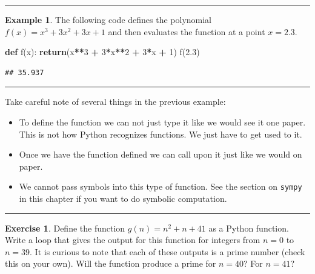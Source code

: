 \documentclass[
]{book}
\newenvironment{Shaded}{\begin{snugshade}}{\end{snugshade}}
\newcommand{\ControlFlowTok}[1]{\textcolor[rgb]{0.13,0.29,0.53}{\textbf{#1}}}
\newcommand{\DecValTok}[1]{\textcolor[rgb]{0.00,0.00,0.81}{#1}}
\newcommand{\FloatTok}[1]{\textcolor[rgb]{0.00,0.00,0.81}{#1}}
\newcommand{\KeywordTok}[1]{\textcolor[rgb]{0.13,0.29,0.53}{\textbf{#1}}}
\newcommand{\NormalTok}[1]{#1}
\newcommand{\OperatorTok}[1]{\textcolor[rgb]{0.81,0.36,0.00}{\textbf{#1}}}
\providecommand{\tightlist}{%
  \setlength{\itemsep}{0pt}\setlength{\parskip}{0pt}}
\theoremstyle{definition}
\theoremstyle{definition}
\newtheorem{example}{Example}[chapter]
\theoremstyle{definition}
\newtheorem{exercise}{Exercise}[chapter]
\theoremstyle{remark}
\begin{document}
\begin{center}\rule{0.5\linewidth}{0.5pt}\end{center}

\begin{example}
\protect\hypertarget{exm:unnamed-chunk-680}{}{\label{exm:unnamed-chunk-680} }The following code defines the polynomial \(f(x) = x^3 + 3x^2 + 3x + 1\) and then evaluates the function at a point \(x=2.3\).
\end{example}

\begin{Shaded}
\begin{Highlighting}[]
\KeywordTok{def}\NormalTok{ f(x):}
    \ControlFlowTok{return}\NormalTok{(x}\OperatorTok{**}\DecValTok{3} \OperatorTok{+} \DecValTok{3}\OperatorTok{*}\NormalTok{x}\OperatorTok{**}\DecValTok{2} \OperatorTok{+} \DecValTok{3}\OperatorTok{*}\NormalTok{x }\OperatorTok{+} \DecValTok{1}\NormalTok{)}
\NormalTok{f(}\FloatTok{2.3}\NormalTok{)}
\end{Highlighting}
\end{Shaded}

\begin{verbatim}
## 35.937
\end{verbatim}

\begin{center}\rule{0.5\linewidth}{0.5pt}\end{center}

Take careful note of several things in the previous example:

\begin{itemize}
\tightlist
\item
  To define the function we can not just type it like we would see it one paper. This is not how Python recognizes functions. We just have to get used to it.
\item
  Once we have the function defined we can call upon it just like we would on paper.
\item
  We cannot pass symbols into this type of function. See the section on \texttt{sympy} in this chapter if you want to do symbolic computation.
\end{itemize}

\begin{center}\rule{0.5\linewidth}{0.5pt}\end{center}

\begin{exercise}
\protect\hypertarget{exr:prime-gen}{}{\label{exr:prime-gen} }Define the function \(g(n) = n^2 + n + 41\) as a Python function. Write a loop that gives the output for this function for integers from \(n=0\) to \(n=39\). It is curious to note that each of these outputs is a prime number (check this on your own). Will the function produce a prime for \(n=40\)? For \(n=41\)?
\end{exercise}
\end{document}
